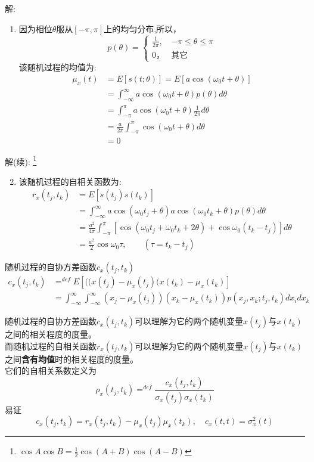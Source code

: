 \begin{frame}
解:
\begin{enumerate}
\item 因为相位$\theta$服从$[-\pi,\pi]$上的均匀分布,所以，
$$p(\theta)=\begin{cases}
\frac{1}{2\pi}, & -\pi\le\theta\le\pi\\
0， &\text{其它}
\end{cases} $$ 
该随机过程的均值为:
\begin{align*}
\mu_{x}(t)&=E[s(t; \theta)]=E[a\cos(\omega_0t+\theta)]\\
&=\int_{-\infty}^{\infty}a\cos(\omega_0t+\theta)p(\theta)d\theta\\
&=\int_{-\pi}^{\pi}a\cos(\omega_0t+\theta)\frac{1}{2\pi}d\theta\\
&=\frac{a}{2\pi}\int_{-\pi}^{\pi}\cos(\omega_0t+\theta)d\theta\\
&=0
\end{align*}
\end{enumerate}
\end{frame}

\begin{frame}
解(续): \footnote{$\cos A\cos B=\frac{1}{2}\cos (A+B)\cos(A-B)$}
\begin{enumerate}
\setcounter{enumi}{1} %
\item 该随机过程的自相关函数为:
\begin{align*}
r_x(t_j,t_k)&=E[s(t_j)s(t_k)]\\
&=\int_{-\infty}^{\infty}a\cos(\omega_0t_j+\theta)a\cos(\omega_0t_k+\theta)p(\theta)d\theta\\
&=\frac{a^2}{4\pi}\int_{-\pi}^{\pi}[\cos(\omega_0t_j+\omega_0t_k+2\theta)+\cos\omega_0(t_k-t_j)]d\theta\\
&=\frac{a^2}{2}\cos\omega_0\tau,\qquad(\tau=t_k-t_j)
\end{align*}
\end{enumerate}
\end{frame}

\begin{frame}
\begin{block}{随机过程的自协方差函数$c_x(t_j,t_k)$}
\begin{align*}
c_x(t_j,t_k)&\mathop{=}^{def}E[((x(t_j)-\mu_x(t_j)(x(t_k)-\mu_x(t_k)]\\
&=\int_{-\infty}^{\infty}\int_{-\infty}^{\infty}(x_j-\mu_x(t_j))(x_k-\mu_x(t_k))p(x_j,x_k;t_j,t_k)dx_idx_k
\end{align*}
\end{block}
随机过程的自协方差函数$c_x(t_j,t_k)$可以理解为它的两个随机变量$x(t_j)$与$x(t_k)$之间的相关程度的度量。\\
而随机过程的自相关函数$r_x(t_j,t_k)$可以理解为它的两个随机变量$x(t_j)$与$x(t_k)$之间\textbf{含有均值}时的相关程度的度量。\\
它们的自相关系数定义为
\[\rho_x(t_j,t_k)\mathop{=}^{def}\frac{c_x(t_j,t_k)}{\sigma_x(t_j)\sigma_x(t_k)}\]
易证
\[c_x(t_j,t_k)=r_x(t_j,t_k)-\mu_x(t_j)\mu_x(t_k),\quad c_x(t,t)=\sigma_x^2(t)\]
\end{frame}

